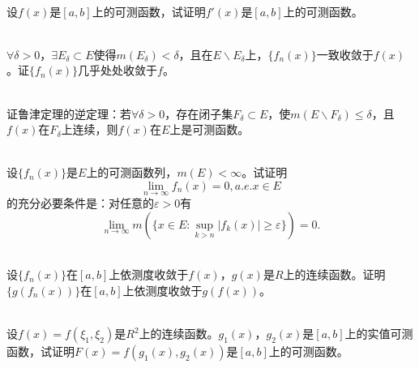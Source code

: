 \begin{exercise}
\hfill\\
设$f(x)$是$[a,b]$上的可测函数，试证明$f'(x)$是$[a,b]$上的可测函数。



\end{exercise}


\begin{exercise}
\hfill\\
$\forall\delta>0$，$\exists E_{\delta}\subset E$使得$m(E_{\delta})<\delta$，且在$E\backslash E_{\delta}$上，$\{f_n(x)\}$一致收敛于$f(x)$。证$\{f_n(x)\}$几乎处处收敛于$f$。



\end{exercise}


\begin{exercise}
\hfill\\
证鲁津定理的逆定理：若$\forall\delta>0$，存在闭子集$F_{\delta}\subset E$，使$m(E\backslash F_{\delta})\leq\delta$，且$f(x)$在$F_{\delta}$上连续，则$f(x)$在$E$上是可测函数。



\end{exercise}


\begin{exercise}
\hfill\\
设$\{f_n(x)\}$是$E$上的可测函数列，$m(E)<\infty$。试证明$$\lim_{n\to\infty}f_n(x)=0,a.e.x\in E$$的充分必要条件是：对任意的$\varepsilon>0$有$$\lim_{n\to\infty}m(\{x\in E:\sup_{k>n}|f_k(x)|\geq\varepsilon\})=0.$$



\end{exercise}


\begin{exercise}
\hfill\\
设$\{f_n(x)\}$在$[a,b]$上依测度收敛于$f(x)$，$g(x)$是$R$上的连续函数。证明$\{g(f_n(x))\}$在$[a,b]$上依测度收敛于$g(f(x))$。



\end{exercise}



\begin{exercise}
\hfill\\
设$f(x)=f(\xi_1,\xi_2)$是$R^2$上的连续函数。$g_1(x)$，$g_2(x)$是$[a,b]$上的实值可测函数，试证明$F(x)=f(g_1(x),g_2(x))$是$[a,b]$上的可测函数。



\end{exercise}


